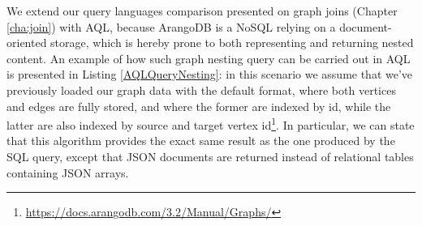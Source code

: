We extend our query languages comparison presented on graph joins (Chapter \ref{cha:join}) with AQL, because ArangoDB is a NoSQL relying on a document-oriented storage, which is hereby prone to both representing and returning nested content. An example of how such graph nesting query can be carried out in AQL is presented in Listing \vref{AQLQueryNesting}: in this scenario we assume that we've previously loaded our graph data with the default format, where both vertices and edges are fully stored, and where the former are indexed by id, while the latter are also indexed by source and target vertex id\footnote{\url{https://docs.arangodb.com/3.2/Manual/Graphs/}}. In particular, we can state that this algorithm provides the exact same result as the one produced by the SQL query, except that JSON documents are returned instead of relational tables containing JSON arrays.
%
%
%
%
%
%
%
